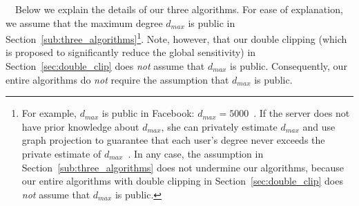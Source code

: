 \smallskip
{}~~Below we explain the details of our three algorithms.
For ease of explanation, we assume that the maximum degree $d_{max}$ is public in Section~\ref{sub:three_algorithms}\footnote{For example, $d_{max}$ is public in Facebook: $d_{max} = 5000$~\cite{Facebook_Limit}.
If the server does not have prior knowledge about $d_{max}$, she can privately estimate $d_{max}$ and use graph projection to guarantee that each user's degree never exceeds the private estimate of $d_{max}$~\cite{Imola_USENIX21}.
In any case, the assumption in Section~\ref{sub:three_algorithms} does not undermine our algorithms, because our entire algorithms with double clipping in Section~\ref{sec:double_clip} does \textit{not} assume that $d_{max}$ is public.}.
Note, however, that
our double clipping (which is proposed to significantly reduce the global sensitivity) in Section~\ref{sec:double_clip} does \textit{not} assume that $d_{max}$ is public.
Consequently, our entire algorithms 
do \textit{not} require the assumption that $d_{max}$ is public.

